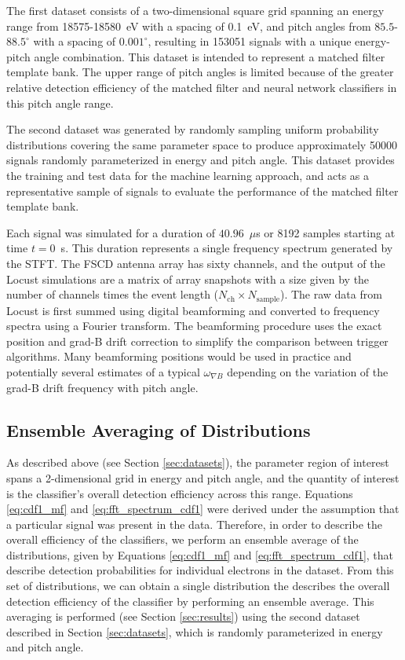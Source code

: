 The first dataset consists of a two-dimensional square grid spanning an energy range from 18575-18580~eV with a spacing of 0.1~eV, and pitch angles from $85.5$-$88.5^\circ$ with a spacing of $0.001^\circ$, resulting in 153051 signals with a unique energy-pitch angle combination. This dataset is intended to represent a matched filter template bank. The upper range of pitch angles is limited because of the greater relative detection efficiency of the matched filter and neural network classifiers in this pitch angle range. 

The second dataset was generated by randomly sampling uniform probability distributions covering the same parameter space to produce approximately 50000 signals randomly parameterized in energy and pitch angle. This dataset provides the training and test data for the machine learning approach, and acts as a representative sample of signals to evaluate the performance of the matched filter template bank.

Each signal was simulated for a duration of $40.96$~$\mu$s or 8192 samples starting at time $t=0$~s. This duration represents a single frequency spectrum generated by the STFT. The FSCD antenna array has sixty channels, and the output of the Locust simulations are a matrix of array snapshots with a size given by the number of channels times the event length ($N_\textrm{ch}\times N_\textrm{sample}$). The raw data from Locust is first summed using digital beamforming and converted to frequency spectra using a Fourier transform. The beamforming procedure uses the exact position and grad-B drift correction to simplify the comparison between trigger algorithms. Many beamforming positions would be used in practice and potentially several estimates of a typical $\omega_{\nabla B}$ depending on the variation of the grad-B drift frequency with pitch angle.

\subsection{Ensemble Averaging of Distributions}
\label{sec:ensemble_average}

As described above (see Section \ref{sec:datasets}), the parameter region of interest spans a 2-dimensional grid in energy and pitch angle, and the quantity of interest is the classifier's overall detection efficiency across this range. Equations \ref{eq:cdf1_mf} and \ref{eq:fft_spectrum_cdf1} were derived under the assumption that a particular signal was present in the data. Therefore, in order to describe the overall efficiency of the classifiers, we perform an ensemble average of the distributions, given by Equations \ref{eq:cdf1_mf} and \ref{eq:fft_spectrum_cdf1}, that describe detection probabilities for individual electrons in the dataset. From this set of distributions, we can obtain a single distribution the describes the overall detection efficiency of the classifier by performing an ensemble average. This averaging is performed (see Section \ref{sec:results}) using the second dataset described in Section \ref{sec:datasets}, which is randomly parameterized in energy and pitch angle.

